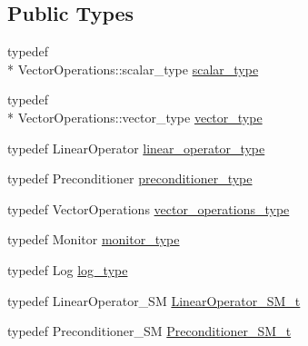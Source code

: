 \subsection*{Public Types}
\begin{DoxyCompactItemize}
\item 
typedef \\*
Vector\-Operations\-::scalar\-\_\-type \hyperlink{classnumerical__algos_1_1sherman__morrison__linear__system_1_1sherman__morrison__linear__system__solve_a818cbec8eb2cd038cf6f25b940c3f1bb}{scalar\-\_\-type}
\item 
typedef \\*
Vector\-Operations\-::vector\-\_\-type \hyperlink{classnumerical__algos_1_1sherman__morrison__linear__system_1_1sherman__morrison__linear__system__solve_aec9272d97681f76dc772bee75ab3c3aa}{vector\-\_\-type}
\item 
typedef Linear\-Operator \hyperlink{classnumerical__algos_1_1sherman__morrison__linear__system_1_1sherman__morrison__linear__system__solve_ae0bbf19b232b98cc8b298a7909ceb0b7}{linear\-\_\-operator\-\_\-type}
\item 
typedef Preconditioner \hyperlink{classnumerical__algos_1_1sherman__morrison__linear__system_1_1sherman__morrison__linear__system__solve_aecf0ad1e8bec52c135746a0890d0cb4e}{preconditioner\-\_\-type}
\item 
typedef Vector\-Operations \hyperlink{classnumerical__algos_1_1sherman__morrison__linear__system_1_1sherman__morrison__linear__system__solve_a737e301e18d9443d9aeb9a07ae87ef51}{vector\-\_\-operations\-\_\-type}
\item 
typedef Monitor \hyperlink{classnumerical__algos_1_1sherman__morrison__linear__system_1_1sherman__morrison__linear__system__solve_aa758c9aa0de7521078408103a5f9825d}{monitor\-\_\-type}
\item 
typedef Log \hyperlink{classnumerical__algos_1_1sherman__morrison__linear__system_1_1sherman__morrison__linear__system__solve_a4b4703435cfb529507ef87613ab87214}{log\-\_\-type}
\item 
typedef Linear\-Operator\-\_\-\-S\-M \hyperlink{classnumerical__algos_1_1sherman__morrison__linear__system_1_1sherman__morrison__linear__system__solve_a27aa5b8ed7e0d3bf53d48698f32aea16}{Linear\-Operator\-\_\-\-S\-M\-\_\-t}
\item 
typedef Preconditioner\-\_\-\-S\-M \hyperlink{classnumerical__algos_1_1sherman__morrison__linear__system_1_1sherman__morrison__linear__system__solve_a93a7b771196ea179d7c5cfc6e4f55ca4}{Preconditioner\-\_\-\-S\-M\-\_\-t}

\end{DoxyCompactItemize}
